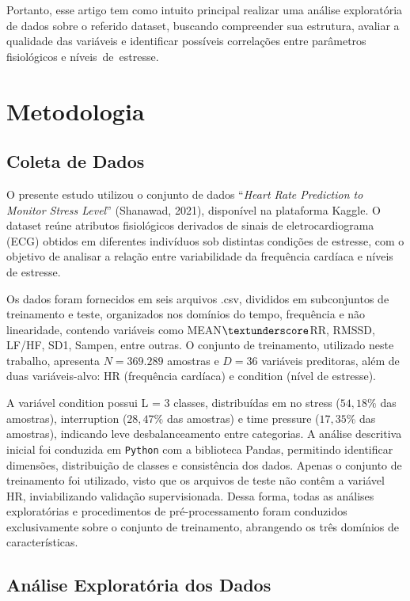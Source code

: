 \documentclass[conference]{IEEEtran}
\begin{document}
Portanto, esse artigo tem como intuito principal realizar uma análise exploratória de dados sobre o referido dataset, buscando compreender sua estrutura, 
avaliar a qualidade das variáveis e identificar possíveis correlações entre parâmetros fisiológicos e níveis de estresse.

\section{Metodologia}

\subsection{Coleta de Dados}

O presente estudo utilizou o conjunto de dados “\textit{Heart Rate Prediction to Monitor Stress Level}” (Shanawad, 2021), disponível na plataforma Kaggle. O dataset reúne atributos fisiológicos derivados de sinais de eletrocardiograma (ECG) obtidos em diferentes indivíduos sob distintas condições de estresse, com o objetivo de analisar a relação entre variabilidade da frequência cardíaca e níveis de estresse.

Os dados foram fornecidos em seis arquivos .csv, divididos em subconjuntos de treinamento e teste, organizados nos domínios do tempo, frequência e não linearidade, contendo variáveis como MEAN$\textunderscore$RR, RMSSD, LF/HF, SD1, Sampen, entre outras. O conjunto de treinamento, utilizado neste trabalho, apresenta $N = 369.289$ amostras e $D = 36$ variáveis preditoras, além de duas variáveis-alvo: HR (frequência cardíaca) e condition (nível de estresse).

A variável condition possui L = 3 classes, distribuídas em no stress ($54,18\%$ das amostras), interruption ($28,47\%$ das amostras) e time pressure ($17,35\%$ das amostras), indicando leve desbalanceamento entre categorias. A análise descritiva inicial foi conduzida em {\tt Python} com a biblioteca Pandas, permitindo identificar dimensões, distribuição de classes e consistência dos dados. Apenas o conjunto de treinamento foi utilizado, visto que os arquivos de teste não contêm a variável HR, inviabilizando validação supervisionada. Dessa forma, todas as análises exploratórias e procedimentos de pré-processamento foram conduzidos exclusivamente sobre o conjunto de treinamento, abrangendo os três domínios de características.

\subsection{Análise Exploratória dos Dados}
\end{document}
